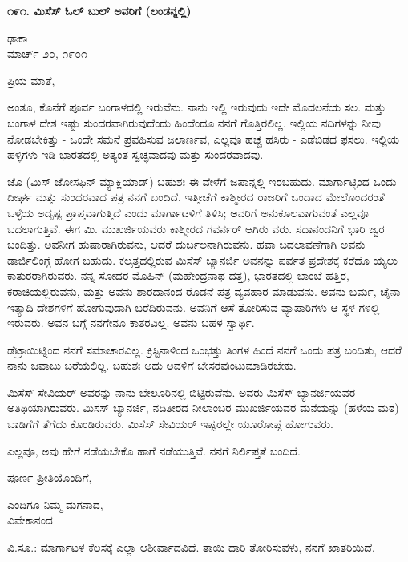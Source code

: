 \begin{center}
\textbf{೧೯೧. ಮಿಸೆಸ್ ಓಲ್ ಬುಲ್ ಅವರಿಗೆ (ಲಂಡನ್ನಲ್ಲಿ)}
\end{center}

\begin{flushright}
ಢಾಕಾ\\ಮಾರ್ಚ್ ೨೦, ೧೯೦೧
\end{flushright}

ಪ್ರಿಯ ಮಾತೆ,

ಅಂತೂ, ಕೊನೆಗೆ ಪೂರ್ವ ಬಂಗಾಳದಲ್ಲಿ ಇರುವೆನು. ನಾನು ಇಲ್ಲಿ ಇರುವುದು ಇದೇ ಮೊದಲನೆಯ ಸಲ. ಮತ್ತು ಬಂಗಾಳ ದೇಶ ಇಷ್ಟು ಸುಂದರವಾಗಿರುವುದೆಂದು ಹಿಂದೆಂದೂ ನನಗೆ ಗೊತ್ತಿರಲಿಲ್ಲ. ಇಲ್ಲಿಯ ನದಿಗಳನ್ನು ನೀವು ನೋಡಬೇಕಿತ್ತು - ಒಂದೇ ಸಮನೆ ಪ್ರವಹಿಸುವ ಜಲಾರ್ಣವ, ಎಲ್ಲವೂ ಹಚ್ಚ ಹಸಿರು - ಎಡೆಬಿಡದ ಫಸಲು. ಇಲ್ಲಿಯ ಹಳ್ಳಿಗಳು ಇಡಿ ಭಾರತದಲ್ಲಿ ಅತ್ಯಂತ ಸ್ವಚ್ಛವಾದವು ಮತ್ತು ಸುಂದರವಾದವು.

ಜೊ (ಮಿಸ್ ಜೋಸಫಿನ್ ಮ್ಯಾಕ್ಲಿಯಾಡ್) ಬಹುಶಃ ಈ ವೇಳೆಗೆ ಜಪಾನ್ನಲ್ಲಿ ಇರಬಹುದು. ಮಾರ್ಗಾಟ್ಳಿಂದ ಒಂದು ದೀರ್ಘ ಮತ್ತು ಸುಂದರವಾದ ಪತ್ರ ನನಗೆ ಬಂದಿದೆ. ಇತ್ತೀಚೆಗೆ ಕಾಶ್ಮೀರದ ರಾಜರಿಗೆ ಒಂದಾದ ಮೇಲೊಂದರಂತೆ ಒಳ್ಳೆಯ ಅದೃಷ್ಟ ಪ್ರಾಪ್ತವಾಗುತ್ತಿದೆ ಎಂದು ಮಾರ್ಗಾಟಳಿಗೆ ತಿಳಿಸಿ; ಅವರಿಗೆ ಅನುಕೂಲವಾಗುವಂತೆ ಎಲ್ಲವೂ ಬದಲಾಗುತ್ತಿವೆ. ಈಗ ಮಿ. ಮುಖರ್ಜಿಯವರು ಕಾಶ್ಮೀರದ ಗವರ್ನರ್ ಆಗಿರು ವರು. ಸದಾನಂದನಿಗೆ ಭಾರಿ ಜ್ವರ ಬಂದಿತ್ತು. ಅವನೀಗ ಹುಷಾರಾಗಿರುವನು, ಆದರೆ ದುರ್ಬಲನಾಗಿರುವನು. ಹವಾ ಬದಲಾವಣೆಗಾಗಿ ಅವನು ಡಾರ್ಜಿಲಿಂಗ್ಗೆ ಹೋಗ ಬಹುದು. ಕಲ್ಕತ್ತದಲ್ಲಿರುವ ಮಿಸೆಸ್ ಬ್ಯಾನರ್ಜಿ ಅವನನ್ನು ಪರ್ವತ ಪ್ರದೇಶಕ್ಕೆ ಕರೆದೊ ಯ್ಯಲು ಕಾತುರರಾಗಿರುವರು. ನನ್ನ ಸೋದರ ಮೊಹಿನ್ (ಮಹೇಂದ್ರನಾಥ ದತ್ತ), ಭಾರತದಲ್ಲಿ ಬಾಂಬೆ ಹತ್ತಿರ, ಕರಾಚಿಯಲ್ಲಿರುವನು, ಮತ್ತು ಅವನು ಶಾರದಾನಂದ ರೊಡನೆ ಪತ್ರ ವ್ಯವಹಾರ ಮಾಡುವನು. ಅವನು ಬರ್ಮ, ಚೈನಾ ಇತ್ಯಾದಿ ದೇಶಗಳಿಗೆ ಹೋಗುವುದಾಗಿ ಬರೆದಿರುವನು. ಅವನಿಗೆ ಆಸೆ ತೋರಿಸುವ ವ್ಯಾಪಾರಿಗಳು ಆ ಸ್ಥಳ ಗಳಲ್ಲಿ ಇರುವರು. ಅವನ ಬಗ್ಗೆ ನನಗೇನೂ ಕಾತರವಿಲ್ಲ. ಅವನು ಬಹಳ ಸ್ವಾರ್ಥಿ.

ಡೆಟ್ರಾಯಿಟ್ನಿಂದ ನನಗೆ ಸಮಾಚಾರವಿಲ್ಲ. ಕ್ರಿಸ್ಟಿನಾಳಿಂದ ಒಂಭತ್ತು ತಿಂಗಳ ಹಿಂದೆ ನನಗೆ ಒಂದು ಪತ್ರ ಬಂದಿತು, ಆದರೆ ನಾನು ಜವಾಬು ಬರೆಯಲಿಲ್ಲ. ಬಹುಶಃ ಅದು ಅವಳಿಗೆ ಬೇಸರವುಂಟುಮಾಡಿರಬೇಕು.

ಮಿಸೆಸ್ ಸೇವಿಯರ್ ಅವರನ್ನು ನಾನು ಬೇಲೂರಿನಲ್ಲಿ ಬಿಟ್ಟಿರುವೆನು. ಅವರು ಮಿಸೆಸ್ ಬ್ಯಾನರ್ಜಿಯವರ ಅತಿಥಿಯಾಗಿರುವರು. ಮಿಸಸ್ ಬ್ಯಾನರ್ಜಿ, ನದಿತೀರದ ನೀಲಾಂಬರ ಮುಖರ್ಜಿಯವರ ಮನೆಯನ್ನು (ಹಳೆಯ ಮಠ) ಬಾಡಿಗೆಗೆ ತೆಗೆದು ಕೊಂಡಿರುವರು. ಮಿಸೆಸ್ ಸೇವಿಯರ್ ಇಷ್ಟರಲ್ಲೇ ಯೂರೋಪ್ಗೆ ಹೋಗುವರು.

ಎಲ್ಲವೂ, ಅವು ಹೇಗೆ ನಡೆಯಬೇಕೊ ಹಾಗೆ ನಡೆಯುತ್ತಿವೆ. ನನಗೆ ನಿರ್ಲಿಪ್ತತೆ ಬಂದಿದೆ.

ಪೂರ್ಣ ಪ್ರೀತಿಯೊಂದಿಗೆ,

\begin{flushright}
ಎಂದಿಗೂ ನಿಮ್ಮ ಮಗನಾದ,\\ವಿವೇಕಾನಂದ
\end{flushright}

ವಿ.ಸೂ.: ಮಾರ್ಗಾಟಳ ಕೆಲಸಕ್ಕೆ ಎಲ್ಲಾ ಆಶೀರ್ವಾದವಿದೆ. ತಾಯಿ ದಾರಿ ತೋರಿಸುವಳು, ನನಗೆ ಖಾತರಿಯಿದೆ.

